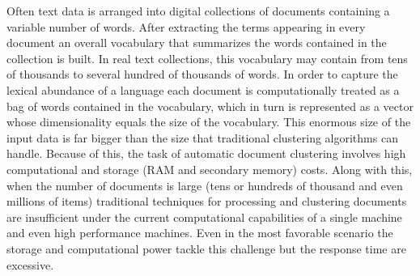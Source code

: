 \documentclass[10pt]{article}
\begin{document}
Often text data is arranged into digital collections of documents containing a variable number of  words. 
After extracting the terms appearing in every document an overall vocabulary that summarizes the words contained in the collection is built. 
In real text collections, this vocabulary may contain from tens of thousands to several hundred of thousands of words. 
In order to capture the lexical abundance of a language each document is computationally treated as a bag of words contained in the vocabulary, which in turn is represented as a vector whose dimensionality equals the size of the vocabulary.
This enormous size of the input data is far bigger than the size that traditional clustering algorithms can handle. 
Because of this, the task of automatic document clustering involves high computational and storage (RAM and secondary memory) costs. 
Along with this, when the number of documents is large (tens or hundreds of thousand and even millions of items)  traditional techniques for processing and clustering documents are insufficient under the current computational capabilities of a single machine and even high performance machines. 
Even in the most favorable scenario the storage and computational power tackle this challenge but the response time are excessive.
\end{document}
